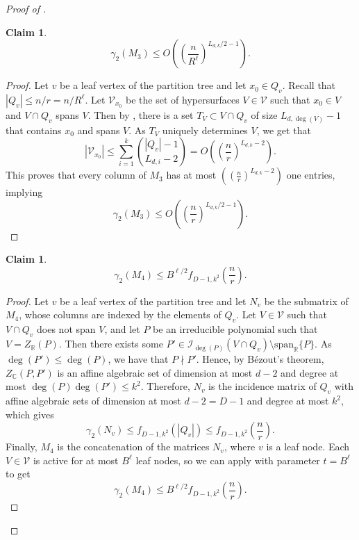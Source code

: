 \documentclass[11pt]{article}
\theoremstyle{plain}
\newtheorem{claim}[theorem]{Claim}
\theoremstyle{definition}
\begin{document}
\begin{proof}[Proof of ]
		\begin{claim}
			$$\gamma_2(M_3)\leq O\left(\left(\frac{n}{R^{\ell}}\right)^{L_{d,k}/2-1}\right).$$
		\end{claim}
		\begin{proof}
			Let $v$ be a leaf vertex of the partition tree and let $x_0\in Q_v$. Recall that $|Q_v|\leq n/r=n/R^{\ell}$. Let $\mathcal{V}_{x_0}$ be the set of hypersurfaces $V\in \mathcal{V}$ such that $x_0\in V$ and $V\cap Q_v$ spans $V$. Then by , there is a set $T_V\subset V\cap Q_v$ of size $L_{d,\deg(V)}-1$ that contains $x_0$ and spans $V$. As $T_V$ uniquely determines $V$, we get that 
			$$|\mathcal{V}_{x_0}|\leq \sum_{i=1}^k \binom{|Q_v|-1}{L_{d,i}-2}=O\left(\left(\frac{n}{r}\right)^{L_{d,k}-2}\right).$$
			This proves that every column of $M_3$ has at most $\left(\left(\frac{n}{r}\right)^{L_{d,k}-2}\right)$ one entries, implying
			$$\gamma_2(M_3)\leq O\left(\left(\frac{n}{r}\right)^{L_{d,k}/2-1}\right).$$
		\end{proof}
		
		\begin{claim}
			$$\gamma_2(M_4)\leq B^{\ell/2}f_{D-1,k^2}\left(\frac{n}{r}\right).$$
		\end{claim}
		
		\begin{proof}
			Let $v$ be a leaf vertex of the partition tree and let $N_v$ be the submatrix of $M_4$, whose columns are indexed by the elements of $Q_v$. Let $V\in \mathcal{V}$ such that $V\cap Q_v$ does not span $V$, and let $P$ be an irreducible polynomial such that $V=Z_{\mathbb{R}}(P)$. Then there exists some $P'\in \mathcal{I}_{\deg(P)}(V\cap Q_v)\setminus \text{span}_{\mathbb{R}}\{P\}$. As $\deg(P')\leq \deg(P)$, we have that $P\nmid P'$. Hence, by B\'ezout's theorem, $Z_{\mathbb{C}}(P,P')$ is an affine algebraic set of dimension at most $d-2$ and degree at most $\deg(P)\deg(P')\leq k^2$. Therefore, $N_v$ is the incidence matrix of $Q_v$ with affine algebraic sets of dimension at most $d-2=D-1$ and degree at most $k^2$, which gives
			$$\gamma_2(N_v)\leq f_{D-1,k^2}(|Q_v|)\leq f_{D-1,k^2}\left(\frac{n}{r}\right).$$
			Finally, $M_4$ is the concatenation of the matrices $N_v$, where $v$ is a leaf node. Each $V\in \mathcal{V}$ is active for at most $B^{\ell}$ leaf nodes, so we can apply  with parameter $t=B^{\ell}$ to get
			$$\gamma_2(M_4)\leq B^{\ell/2}f_{D-1,k^2}\left(\frac{n}{r}\right).$$
		\end{proof}
		

\end{proof}
\end{document}
